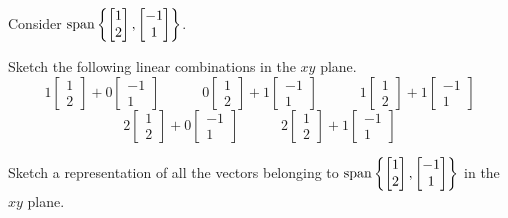 \begin{applicationActivities}
\begin{activity}{10}
  Consider \(\operatorname{span}\left\{\begin{bmatrix}1\\2\end{bmatrix},
  \begin{bmatrix}-1\\1\end{bmatrix}\right\}\).
  \begin{subactivity}
    Sketch the following linear combinations in the \(xy\) plane.
    \[
    1\begin{bmatrix}1\\2\end{bmatrix}+
    0\begin{bmatrix}-1\\1\end{bmatrix}\hspace{3em}
    0\begin{bmatrix}1\\2\end{bmatrix}+
    1\begin{bmatrix}-1\\1\end{bmatrix}\hspace{3em}
    1\begin{bmatrix}1\\2\end{bmatrix}+
    1\begin{bmatrix}-1\\1\end{bmatrix}
    \]
    \[
    2\begin{bmatrix}1\\2\end{bmatrix}+
    0\begin{bmatrix}-1\\1\end{bmatrix}\hspace{3em}
    2\begin{bmatrix}1\\2\end{bmatrix}+
    1\begin{bmatrix}-1\\1\end{bmatrix}
    \]
  \end{subactivity}
  \begin{subactivity}
    Sketch a representation of all the vectors belonging to
    \(\operatorname{span}\left\{\begin{bmatrix}1\\2\end{bmatrix},
     \begin{bmatrix}-1\\1\end{bmatrix}\right\}\)
    in the \(xy\) plane.
  \end{subactivity}
\end{activity}


\end{applicationActivities}

